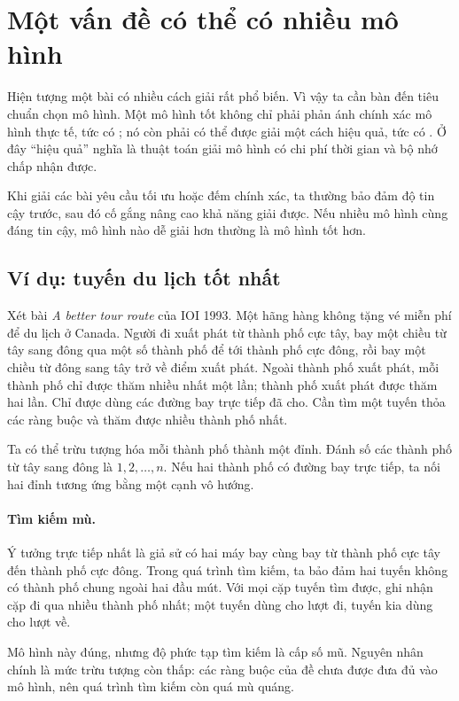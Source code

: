 \documentclass[11pt]{article}
\begin{document}
\section{Một vấn đề có thể có nhiều mô hình}

Hiện tượng một bài có nhiều cách giải rất phổ biến. Vì vậy ta cần bàn đến tiêu
chuẩn chọn mô hình. Một mô hình tốt không chỉ phải phản ánh chính xác mô hình
thực tế, tức có ; nó còn phải có thể được giải một cách hiệu
quả, tức có . Ở đây ``hiệu quả'' nghĩa là thuật toán
giải mô hình có chi phí thời gian và bộ nhớ chấp nhận được.

Khi giải các bài yêu cầu tối ưu hoặc đếm chính xác, ta thường bảo đảm độ tin
cậy trước, sau đó cố gắng nâng cao khả năng giải được. Nếu nhiều mô hình cùng
đáng tin cậy, mô hình nào dễ giải hơn thường là mô hình tốt hơn.

\subsection{Ví dụ: tuyến du lịch tốt nhất}

Xét bài \textit{A better tour route} của IOI 1993. Một hãng hàng không tặng vé
miễn phí để du lịch ở Canada. Người đi xuất phát từ thành phố cực tây, bay một
chiều từ tây sang đông qua một số thành phố để tới thành phố cực đông, rồi bay
một chiều từ đông sang tây trở về điểm xuất phát. Ngoài thành phố xuất phát,
mỗi thành phố chỉ được thăm nhiều nhất một lần; thành phố xuất phát được thăm
hai lần. Chỉ được dùng các đường bay trực tiếp đã cho. Cần tìm một tuyến thỏa
các ràng buộc và thăm được nhiều thành phố nhất.

Ta có thể trừu tượng hóa mỗi thành phố thành một đỉnh. Đánh số các thành phố
từ tây sang đông là \(1,2,\ldots,n\). Nếu hai thành phố có đường bay trực tiếp,
ta nối hai đỉnh tương ứng bằng một cạnh vô hướng.

\paragraph{Tìm kiếm mù.}
Ý tưởng trực tiếp nhất là giả sử có hai máy bay cùng bay từ thành phố cực tây
đến thành phố cực đông. Trong quá trình tìm kiếm, ta bảo đảm hai tuyến không
có thành phố chung ngoài hai đầu mút. Với mọi cặp tuyến tìm được, ghi nhận cặp
đi qua nhiều thành phố nhất; một tuyến dùng cho lượt đi, tuyến kia dùng cho
lượt về.

Mô hình này đúng, nhưng độ phức tạp tìm kiếm là cấp số mũ. Nguyên nhân chính
là mức trừu tượng còn thấp: các ràng buộc của đề chưa được đưa đủ vào mô hình,
nên quá trình tìm kiếm còn quá mù quáng.
\end{document}

